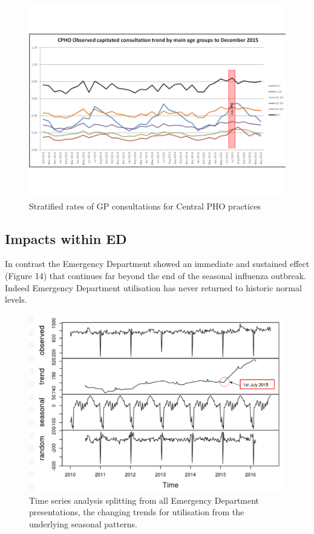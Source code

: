 \documentclass[11pt,a4paper]{article}
\begin{document}
\begin{figure}[htp]
\centering
\includegraphics[scale=0.30]{GPu13.png}
\caption{Stratified rates of GP consultations for Central PHO practices}
\label{Age stratified General Practice consultations}
\end{figure}


\subsection{Impacts within ED}
In contrast the Emergency Department showed an immediate and sustained effect (Figure 14) that continues far beyond the end of the seasonal influenza outbreak. Indeed Emergency Department utilisation has never returned to historic normal levels.\\


\begin{figure}[htp]
\centering
\includegraphics[scale=0.60]{TS_ED.png}
\caption{Time series analysis splitting from all Emergency Department presentations, the changing trends for utilisation from the underlying seasonal patterns.}
\label{Time series analysis of Emergency Department presentations}
\end{figure}
\end{document}
